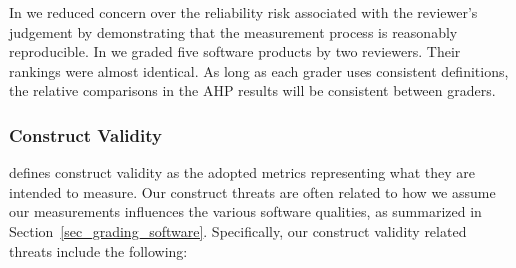 \documentclass[11pt]{article}
\begin{document}
In \citet{SmithEtAl2016} we reduced concern over the reliability risk associated
with the reviewer's judgement by demonstrating that the measurement process is
reasonably reproducible.  In \citet{SmithEtAl2016} we graded five software
products by two reviewers. Their rankings were almost identical. As long as each
grader uses consistent definitions, the relative comparisons in the AHP results
will be consistent between graders.

\subsubsection{Construct Validity}

\citet{RunesonAndHost2009} defines construct validity as the adopted
metrics representing what they are intended to measure. Our construct threats are
often related to how we assume our measurements influences the various software
qualities, as summarized in Section~\ref{sec_grading_software}. Specifically,
our construct validity related threats include the following:
\end{document}

